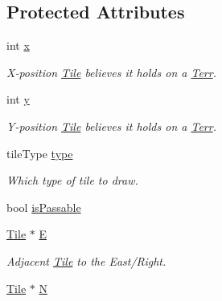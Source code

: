 \subsection*{Protected Attributes}
\begin{DoxyCompactItemize}
\item 
int \hyperlink{class_tile_a47b5eb2072d4b1978923a480043899c9}{x}\hypertarget{class_tile_a47b5eb2072d4b1978923a480043899c9}{}\label{class_tile_a47b5eb2072d4b1978923a480043899c9}

\begin{DoxyCompactList}\small\item\em X-\/position \hyperlink{class_tile}{Tile} believes it holds on a \hyperlink{class_terr}{Terr}. \end{DoxyCompactList}\item 
int \hyperlink{class_tile_a2d87d8813151af6bbd60811964f047a8}{y}\hypertarget{class_tile_a2d87d8813151af6bbd60811964f047a8}{}\label{class_tile_a2d87d8813151af6bbd60811964f047a8}

\begin{DoxyCompactList}\small\item\em Y-\/position \hyperlink{class_tile}{Tile} believes it holds on a \hyperlink{class_terr}{Terr}. \end{DoxyCompactList}\item 
tile\+Type \hyperlink{class_tile_a5aa7ae6350675967edf46400c486a412}{type}\hypertarget{class_tile_a5aa7ae6350675967edf46400c486a412}{}\label{class_tile_a5aa7ae6350675967edf46400c486a412}

\begin{DoxyCompactList}\small\item\em Which type of tile to draw. \end{DoxyCompactList}\item 
bool \hyperlink{class_tile_afa72b458d549b9533f058e2d2fad0f81}{is\+Passable}
\item 
\hyperlink{class_tile}{Tile} $\ast$ \hyperlink{class_tile_a0d63c88d4136aecedcb2756d20615b89}{E}\hypertarget{class_tile_a0d63c88d4136aecedcb2756d20615b89}{}\label{class_tile_a0d63c88d4136aecedcb2756d20615b89}

\begin{DoxyCompactList}\small\item\em Adjacent \hyperlink{class_tile}{Tile} to the East/\+Right. \end{DoxyCompactList}\item 
\hyperlink{class_tile}{Tile} $\ast$ \hyperlink{class_tile_af1255bd2dba8dfa019fcd65a05805ed1}{N}\hypertarget{class_tile_af1255bd2dba8dfa019fcd65a05805ed1}{}\label{class_tile_af1255bd2dba8dfa019fcd65a05805ed1}


\end{DoxyCompactItemize}
